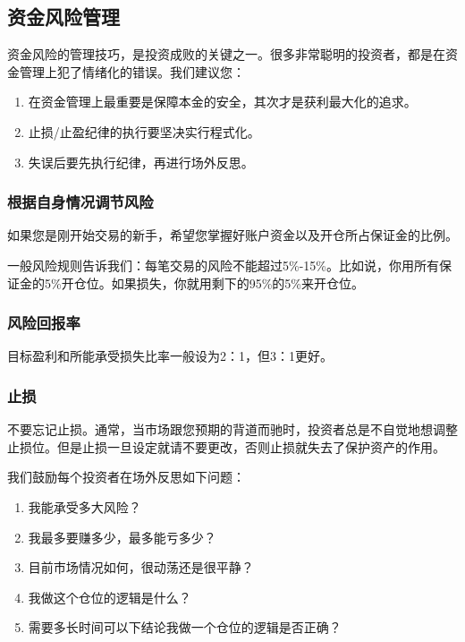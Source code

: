 \subsection {资金风险管理}

    资金风险的管理技巧，是投资成败的关键之一。很多非常聪明的投资者，都是在资金管理上犯了情绪化的错误。我们建议您：
    \begin{enumerate}
        \item  在资金管理上最重要是保障本金的安全，其次才是获利最大化的追求。
        \item  止损/止盈纪律的执行要坚决实行程式化。
        \item  失误后要先执行纪律，再进行场外反思。
    \end{enumerate}

\subsubsection {根据自身情况调节风险}

    如果您是刚开始交易的新手，希望您掌握好账户资金以及开仓所占保证金的比例。

    一般风险规则告诉我们：每笔交易的风险不能超过5\%-15\%。比如说，你用所有保证金的5\%开仓位。如果损失，你就用剩下的95\%的5\%来开仓位。

\subsubsection {风险回报率}

    目标盈利和所能承受损失比率一般设为2：1，但3：1更好。

\subsubsection {止损}

    不要忘记止损。通常，当市场跟您预期的背道而驰时，投资者总是不自觉地想调整止损位。但是止损一旦设定就请不要更改，否则止损就失去了保护资产的作用。

    我们鼓励每个投资者在场外反思如下问题：

    \begin{enumerate}
        \item  我能承受多大风险？
        \item  我最多要赚多少，最多能亏多少？
        \item  目前市场情况如何，很动荡还是很平静？
        \item  我做这个仓位的逻辑是什么？
        \item  需要多长时间可以下结论我做一个仓位的逻辑是否正确？
    \end{enumerate}
